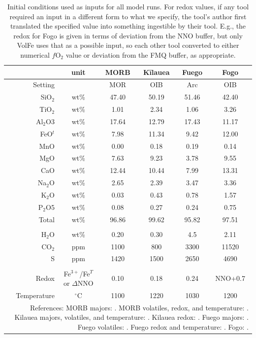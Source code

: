 \begin{table}
    \centering
    \begin{tabular}{rccccc}
        ~ & unit & MORB & Kīlauea & Fuego & Fogo \\ \hline
        Setting & & MOR & OIB & Arc & OIB \\
        SiO$_2$ & wt\% & 47.40 & 50.19 & 51.46 & 42.40 \\ 
        TiO$_2$ & wt\% & 1.01 & 2.34 & 1.06 & 3.26 \\ 
        Al$_2$O3 & wt\% & 17.64 & 12.79 & 17.43 & 11.17 \\ 
        FeO$^t$ & wt\% & 7.98 & 11.34 & 9.42 & 12.00 \\ 
        MnO & wt\% & 0.00 & 0.18 & 0.19 & 0.14 \\ 
        MgO & wt\% & 7.63 & 9.23 & 3.78 & 9.55 \\ 
        CaO & wt\% & 12.44 & 10.44 & 7.99 & 13.31 \\ 
        Na$_2$O & wt\% & 2.65 & 2.39 & 3.47 & 3.36 \\ 
        K$_2$O & wt\% & 0.03 & 0.43 & 0.78 & 1.57 \\ 
        P$_2$O5 & wt\% & 0.08 & 0.27 & 0.24 & 0.75 \\ 
        Total & wt\% & 96.86 & 99.62 & 95.82 & 97.51 \\ 
        & & & & & \\
        H$_2$O & wt\% & 0.20 & 0.30 & 4.5 & 2.11 \\ 
        CO$_2$ & ppm & 1100 & 800 & 3300 & 11520 \\ 
        S & ppm & 1420 & 1500 & 2650 & 4690 \\
        & & & & & \\
        Redox & Fe$^{3+}$/Fe$^T$ or $\Delta$NNO & 0.10 & 0.18 & 0.24 & NNO+0.7 \\
        Temperature & $^{\circ}$C & 1100 & 1220 & 1030 & 1200 \\
    \hline
    \multicolumn{6}{p{\textwidth}}{\footnotesize{References: MORB majors: \cite{Allan1989, GhiorsoGualda2015, WieserVESIcal2022}. MORB volatiles, redox, and temperature: \cite{cottrell2021morb}. Kilauea majors, volatiles, and temperature: \cite{wieser2021reconstructing}. Kilauea redox: \cite{lerner2021petrologic}. Fuego majors: \cite{rasmussen2020vapor, lloyd2013, moore2015bubbles, newcombe2020}. Fuego volatiles: \cite{rasmussen2020vapor}. Fuego redox and temperature: \cite{lloyd2013}. Fogo: \cite{devitre2023oceanic}.}}
    \end{tabular}
    \caption{Initial conditions used as inputs for all model runs. For redox values, if any tool required an input in a different form to what we specify, the tool's author first translated the specified value into something ingestible by their tool. E.g., the redox for Fogo is given in terms of deviation from the NNO buffer, but only VolFe uses that as a possible input, so each other tool converted to either numerical $f$O$_2$ value or deviation from the FMQ buffer, as appropriate.}
    \label{table:basalt-compositions}
\end{table}